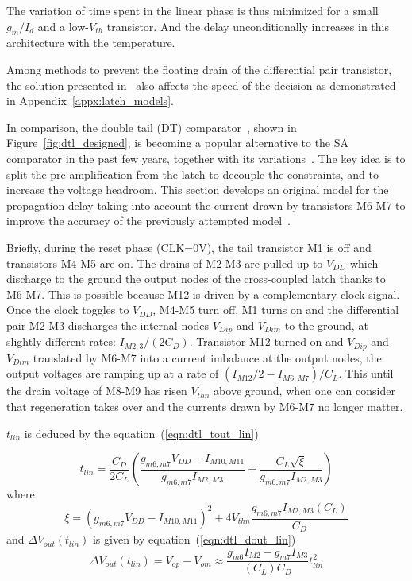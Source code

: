 The variation of time spent in the linear phase is thus minimized for a small \(g_m/I_d\) and a low-\(V_{th}\) transistor. And the delay unconditionally increases in this architecture with the temperature.

Among methods to prevent the floating drain of the differential pair transistor, the solution presented in~\cite{Montanaro1996} also affects the speed of the decision as demonstrated in Appendix~\ref{appx:latch_models}.

In comparison, the double tail (DT) comparator~\cite{Schinkel2007}, shown in Figure~\ref{fig:dtl_designed}, is becoming a popular alternative to the SA comparator in the past few years, together with its variations~\cite{Miyahara2008,Babayan2014,Khorami2016}. The key idea is to split the pre-amplification from the latch to decouple the constraints, and to increase the voltage headroom. This section develops an original model for the propagation delay taking into account the current drawn by transistors M6-M7 to improve the accuracy of the previously attempted model~\cite{Babayan2014}.

Briefly, during the reset phase (CLK=0V), the tail transistor M1 is off and transistors M4-M5 are on. The drains of M2-M3 are pulled up to \(V_{DD}\) which discharge to the ground the output nodes of the cross-coupled latch thanks to M6-M7. This is possible because M12 is driven by a complementary clock signal.
Once the clock toggles to \(V_{DD}\), M4-M5 turn off, M1 turns on and the differential pair M2-M3 discharges the internal nodes \(V_{Dip}\) and \(V_{Dim}\) to the ground, at slightly different rates: \(I_{M2,3}/(2C_{D})\). Transistor M12 turned on and \(V_{Dip}\) and \(V_{Dim}\) translated by M6-M7 into a current imbalance at the output nodes, the output voltages are ramping up at a rate of \((I_{M12}/2-I_{M6,M7})/C_{L}\). This until the drain voltage of M8-M9 has risen \(V_{thn}\) above ground, when one can consider that regeneration takes over and the currents drawn by M6-M7 no longer matter.

\(t_{lin}\) is deduced by the equation~(\ref{eqn:dtl_tout_lin})

\begin{equation}
\label{eqn:dtl_tout_lin}
t_{lin} = \frac{C_D}{2C_L} \left(\frac{g_{m6,m7}V_{DD}-I_{M10,M11}}{g_{m6,m7}I_{M2,M3}} + \frac{C_L\sqrt{\xi}}{g_{m6,m7}I_{M2,M3}} \right)
\end{equation}
where
\begin{equation}
\xi = {\left(g_{m6,m7}V_{DD}-I_{M10,M11}\right)}^2  + 4V_{thn}\frac{g_{m6,m7}I_{M2,M3}(C_{L})}{C_D}
\end{equation}
and \(\Delta V_{out}(t_{lin})\) is given by equation~(\ref{eqn:dtl_dout_lin})
\begin{equation}
\label{eqn:dtl_dout_lin}
\Delta V_{out}(t_{lin}) = V_{op}-V_{om} \approx \frac{g_{m6}I_{M2}-g_{m7}I_{M3}}{(C_{L})C_D}t_{lin}^2
\end{equation}

